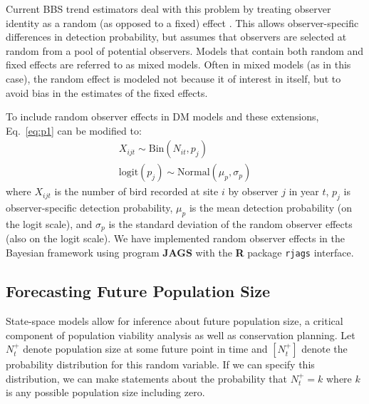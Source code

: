 \documentclass[12pt]{article}
\begin{document}
Current BBS trend estimators deal with this problem by
treating observer identity as a random (as opposed to a fixed)
effect \citep{link_sauer:2002,sauer_link:2011}.
This allows observer-specific differences in detection probability,
but assumes that observers are selected at random from a pool
of potential observers.  Models that contain both random and
fixed effects are referred to as mixed models.  Often in mixed
models (as in this case), the random effect is modeled not
because it of interest in itself, but to avoid bias in the
estimates of the fixed effects.

To include random observer effects in DM models and these
extensions, Eq.~\ref{eq:p1} can be modified to:
\begin{gather}
X_{ijt} \sim \mathrm{Bin}(N_{it}, p_j) \nonumber \\
\mathrm{logit}(p_j) \sim \mathrm{Normal}(\mu_p, \sigma_p)
\label{eq:pobs}
\end{gather}
where $X_{ijt}$ is the number of bird recorded at site $i$ by
observer $j$ in year $t$, $p_j$ is observer-specific detection probability,
$\mu_p$ is the mean detection probability (on the logit scale), and $\sigma_p$ is
the standard deviation of the random observer effects (also on the logit scale). 
We have implemented random observer effects in the Bayesian
framework using program \textbf{JAGS} \citep[version 3.2.0]{plummer:2003}
with the \textbf{R} package \texttt{rjags} \citep{plummer:2011,R-2012} interface.



\subsection{Forecasting Future Population Size}

State-space models allow for inference about future population size,
a critical component of population viability analysis as well
as conservation planning. Let $N^+_{t}$ denote population size at some
future point in time and $[N^+_t]$ denote the probability
distribution for this random variable. If we can specify this
distribution, we can make statements about the
probability that $N^+_t = k$ where $k$ is any possible
population size including zero.
\end{document}
